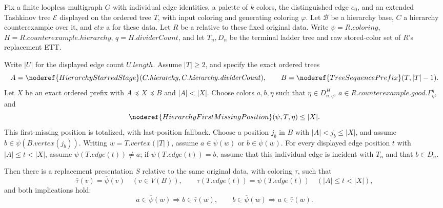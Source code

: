 \begin{lemma}
Fix a finite loopless multigraph \(G\) with individual edge identities, a
palette of \(k\) colors, the distinguished edge \(e_0\), and an extended
Tashkinov tree \(\mathcal E\) displayed on the ordered tree \(T\), with
input coloring and generating coloring \(\varphi\). Let \(\mathcal B\)
be a hierarchy base, \(C\) a hierarchy counterexample over it, and
\(\mathit{ctx}\) a  for
these data. Let \(R\) be a 
relative to these fixed original data. Write \(\psi=R.\mathit{coloring}\),
\(H=R.\mathit{counterexample}.\mathit{hierarchy}\), \(q=H.\mathit{dividerCount}\),
and let \(T_n,D_n\) be the terminal ladder tree and raw stored-color set
of \(R\)'s replacement ETT.

Write \(|U|\) for the displayed edge count \(U.\mathit{length}\).
Assume \(|T|\geq2\), and specify the exact ordered trees
\[
 A=\noderef{HierarchyStarredStage}(C.\mathit{hierarchy},
       C.\mathit{hierarchy}.\mathit{dividerCount}),\qquad
 B=\noderef{TreeSequencePrefix}(T,|T|-1).
\]
Let \(X\) be an exact ordered prefix with
\(A\preccurlyeq X\preccurlyeq B\) and \(|A|<|X|\). Choose colors
\(a,b,\eta\) such that \(\eta\in D^H_{n,q}\),
\(a\in R.\mathit{counterexample}.\mathit{good}.\Gamma^q_\eta\), and
\[
 \noderef{HierarchyFirstMissingPosition}(\psi,T,\eta)\leq |X|.
\]
This first-missing position is totalized, with last-position fallback.
Choose a position \(j_b\) in \(B\) with
\(|A|<j_b\leq |X|\), and assume \(b\in\overline\psi(B.vertex(j_b))\).
Writing \(w=T.vertex(|T|)\), assume
\(a\in\overline\psi(w)\) or \(b\in\overline\psi(w)\).
For every displayed edge position \(t\) with \(|A|\leq t<|X|\), assume
\(\psi(T.edge(t))\ne a\); if \(\psi(T.edge(t))=b\), assume that this
individual edge is incident with \(T_n\) and that \(b\in D_n\).

Then there is a replacement presentation \(S\) relative to the same
original data, with coloring \(\tau\), such that
\[
 \overline\tau(v)=\overline\psi(v)\quad(v\in V(B)),\qquad
 \tau(T.edge(t))=\psi(T.edge(t))\quad(|A|\leq t<|X|),
\]
and both implications hold:
\[
 a\in\overline\psi(w)\Longrightarrow b\in\overline\tau(w),\qquad
 b\in\overline\psi(w)\Longrightarrow a\in\overline\tau(w).
\]
\end{lemma}
